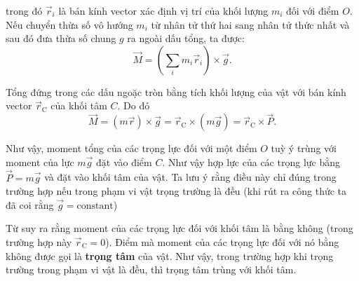 \noindent
trong đó $\vec{r}_i$ là bán kính vector xác định vị trí của khối lượng $m_i$ đối với điểm $O$. Nếu chuyển thừa số vô hướng $m_i$ từ nhân tử thứ hai sang nhân tử thức nhất và sau đó đưa thừa số chung $g$ ra ngoài dấu tổng, ta được:
\begin{equation*}
	\vec{M} = \left(\sum_i m_i \vec{r}_i\right) \times \vec{g}.
\end{equation*}

\noindent
Tổng đứng trong các dấu ngoặc tròn bằng tích khối lượng của vật với bán kính vector $\vec{r}_{\text{C}}$ của khối tâm $C$. Do đó
\begin{equation}\label{eq:5_56}
	\vec{M} = (m\vec{r})\times\vec{g} = \vec{r}_{\text{C}} \times (m\vec{g}) = \vec{r}_{\text{C}} \times \vec{P}.
\end{equation}

\noindent
Như vậy, moment tổng của các trọng lực đối với một điểm $O$ tuỳ ý trùng với moment của lực $m\vec{g}$ đặt vào điểm $C$. Như vậy hợp lực của các trọng lực bằng $\vec{P}=m\vec{g}$ và đặt vào khối tâm của vật. Ta lưu ý rằng điều này chỉ đúng trong trường hợp nếu trong phạm vi vật trọng trường là đều (khi rút ra công thức  ta đã coi rằng $\vec{g}=\text{constant}$)

Từ  suy ra rằng moment của các trọng lực đối với khối tâm là bằng không (trong trường hợp này $\vec{r}_{\text{C}}=0$). Điểm mà moment của các trọng lực đối với nó bằng không được gọi là \textbf{trọng tâm} của vật. Như vậy, trong trường hợp khi trọng trường trong phạm vi vật là đều, thì trọng tâm trùng với khối tâm.

